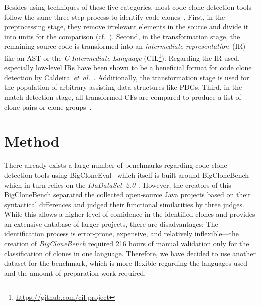 \documentclass[10pt,journal,compsoc]{IEEEtran}
\def\todo#1{\textcolor{brown!80!yellow!70!black!90!red}{[\textsc{todo}: \textsf{#1}]}}
\newcommand*\urldate[2]{\url{#1}\;\textsuperscript{\color{gray}\DTMdate{#2}}}
\newcommand*\footurl[3][]{\footnote{#1\urldate{#2}{#3}}}
\begin{document}
Besides using techniques of these five categories, most code clone detection tools follow the same three step process to identify code clones~\cite{10.1145/3381307.3381310,ain2019systematic}.
First, in the preprocessing stage, they remove irrelevant elements in the source and divide it into units for the comparison (cf.~\cite{kamiya2002ccfinder,rattan2013software}).
Second, in the transformation stage, the remaining source code is transformed into an \textsl{intermediate representation}~(IR) like an AST or the \textit{C Intermediate Language} (CIL\footurl{https://github.com/cil-project}{2022-02-15}).
Regarding the IR used, especially low-level IRs have been shown to be a beneficial format for code clone detection by Caldeira~\textsl{et~al.}~\cite{caldeira2020improving}.
Additionally, the transformation stage is used for the population of arbitrary assisting data structures like PDGs.
Third, in the match detection stage, all transformed CFs are compared to produce a list of clone pairs or clone groups~\cite{roy2009comparison}.





\section{Method}\label{sec:Method}
There already exists a large number of benchmarks regarding code clone detection tools using BigCloneEval~\cite{svajlenko2014towards} which itself is built around BigCloneBench~\cite{svajlenko2021bigclonebench} which in turn relies on the \textsl{IJaDataSet~2.0}~\cite{ijadataset}.
However, the creators of this BigCloneBench separated the collected open-source Java projects based on their syntactical differences and judged their functional similarities by three judges.
While this allows a higher level of confidence in the identified clones and provides an extensive database of larger projects, there are disadvantages:
The identification process is error-prone, expensive, and relatively inflexible---the creation of \textsl{BigCloneBench} required 216 hours of manual validation only for the classification of clones in one language.
Therefore, we have decided to use another dataset for the benchmark, which is more flexible regarding the languages used and the amount of preparation work required.
\end{document}
